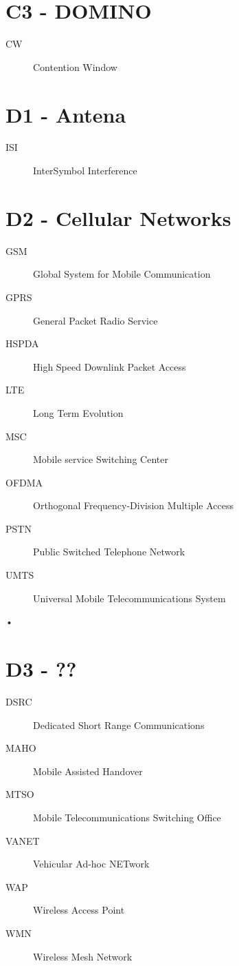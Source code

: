 \documentclass[twocolumn]{article}
\begin{document}
\begin{spacing}{0.5}
\section*{C3 - DOMINO}
\begin{description}
\item[CW]Contention Window
\end{description}

\section*{D1 - Antena}
\begin{description}
\item[ISI]InterSymbol Interference
\end{description}

\section*{D2 - Cellular Networks}
\begin{description}
\item[GSM]Global System for Mobile Communication
\item[GPRS]General Packet Radio Service
\item[HSPDA]High Speed Downlink Packet Access
\item[LTE]Long Term Evolution
\item[MSC]Mobile service Switching Center
\item[OFDMA]Orthogonal Frequency-Division Multiple Access
\item[PSTN]Public Switched Telephone Network
\item[UMTS]Universal Mobile Telecommunications System
\end{description}•

\section*{D3 - ??}
\begin{description}
\item[DSRC]Dedicated Short Range Communications
\item[MAHO]Mobile Assisted Handover
\item[MTSO]Mobile Telecommunications Switching Office
\item[VANET]Vehicular Ad-hoc NETwork
\item[WAP]Wireless Access Point
\item[WMN]Wireless Mesh Network
\end{description}


\end{spacing}
\end{document}

